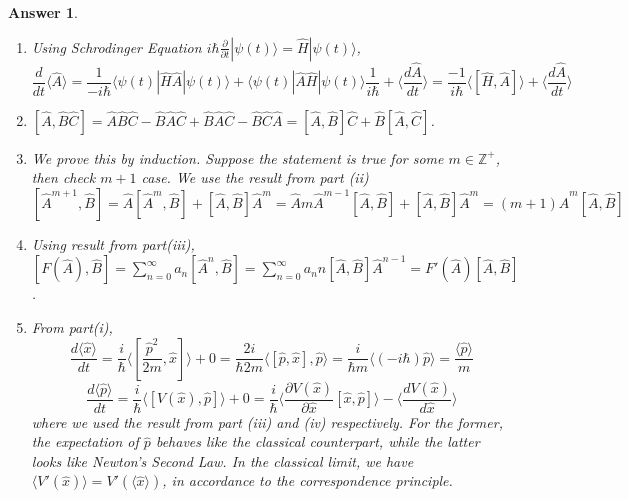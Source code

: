 \documentclass[a4paper]{article}
\newtheorem{ans}{Answer}[subsection]
\theoremstyle{new}
\begin{document}
\begin{ans}\leavevmode
\begin{enumerate}[label=(\roman*)]
\item Using Schrodinger Equation $i\hbar\frac{\partial}{\partial t}|\psi(t)\rangle=\hat{H}|\psi(t)\rangle$, 
$$\frac{d}{dt}\langle\hat{A}\rangle=\frac{1}{-i\hbar}\langle\psi(t)|\hat{H}\hat{A}|\psi(t)\rangle+\langle\psi(t)|\hat{A}\hat{H}|\psi(t)\rangle\frac{1}{i\hbar}+\bigg\langle\frac{d\hat{A}}{dt}\bigg\rangle=\frac{-1}{i\hbar}\langle[\hat{H},\hat{A}]\rangle+\bigg\langle\frac{d\hat{A}}{dt}\bigg\rangle$$
\item $[\hat{A},\hat{B}\hat{C}]=\hat{A}\hat{B}\hat{C}-\hat{B}\hat{A}\hat{C}+\hat{B}\hat{A}\hat{C}-\hat{B}\hat{C}\hat{A}=[\hat{A},\hat{B}]\hat{C}+\hat{B}[\hat{A},\hat{C}]$.
\item We prove this by induction. Suppose the statement is true for some $m\in\mathbb{Z}^+$, then check $m+1$ case. We use the result from part (ii)
$$[\hat{A}^{m+1},\hat{B}]=\hat{A}[\hat{A}^m,\hat{B}]+[\hat{A},\hat{B}]\hat{A}^m=\hat{A}m\hat{A}^{m-1}[\hat{A},\hat{B}]+[\hat{A},\hat{B}]\hat{A}^m=(m+1)\hat{A}^m[\hat{A},\hat{B}]$$
\item Using result from part(iii), $[F(\hat{A}),\hat{B}]=\sum_{n=0}^\infty a_n[\hat{A}^n,\hat{B}]=\sum_{n=0}^\infty a_nn[\hat{A},\hat{B}]\hat{A}^{n-1}=F'(\hat{A})[\hat{A},\hat{B}]$.
\item From part(i),
$$\frac{d\langle\hat{x}\rangle}{dt}=\frac{i}{\hbar}\langle[\frac{\hat{p}^2}{2m},\hat{x}]\rangle+0=\frac{2i}{\hbar2m}\langle[\hat{p},\hat{x}],\hat{p}\rangle=\frac{i}{\hbar m}\langle(-i\hbar)\hat{p}\rangle=\frac{\langle\hat{p}\rangle}{m}$$
$$\frac{d\langle\hat{p}\rangle}{dt}=\frac{i}{\hbar}\langle[V(\hat{x}),\hat{p}]\rangle+0=\frac{i}{\hbar}\bigg\langle\frac{\partial V(\hat{x})}{\partial\hat{x}}[\hat{x},\hat{p}]\bigg\rangle-\bigg\langle\frac{dV(\hat{x})}{d\hat{x}}\bigg\rangle$$
where we used the result from part (iii) and (iv) respectively. For the former, the expectation of $\hat{p}$ behaves like the classical counterpart, while the latter looks like Newton's Second Law. In the classical limit, we have $\langle V'(\hat{x})\rangle=V'(\langle\hat{x}\rangle)$, in accordance to the correspondence principle.
\end{enumerate}
\end{ans}
\newpage
\end{document}
